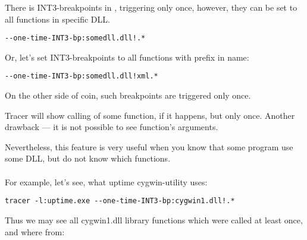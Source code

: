 {There is INT3-breakpoints in \tracer, triggering only once, however, they can be set to all functions
in specific DLL.}

\begin{lstlisting}
--one-time-INT3-bp:somedll.dll!.*
\end{lstlisting}

{Or, let's set INT3-breakpoints to all functions with  prefix in name:}

\begin{lstlisting}
--one-time-INT3-bp:somedll.dll!xml.*
\end{lstlisting}

{On the other side of coin, such breakpoints are triggered only once.}

Tracer 
{will show calling of some function, if it happens, but only once.}
{Another drawback --- it is not possible to see function's arguments.}

{Nevertheless, this feature is very useful when you know that some program use some DLL, but do not know which functions.}
 \\
\\
{For example, let's see, what uptime cygwin-utility uses}:

\begin{lstlisting}
tracer -l:uptime.exe --one-time-INT3-bp:cygwin1.dll!.*
\end{lstlisting}

{Thus we may see all cygwin1.dll library functions which were called at least once, and where from}:



